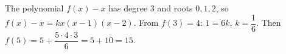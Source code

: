 The polynomial $f(x)-x$ has degree $3$ and roots $0,1,2$, so $f(x)-x=kx(x-1)(x-2)$. From $f(3)=4$: $1=6k$, $k=\dfrac{1}{6}$. Then $f(5)=5+\dfrac{5\cdot4\cdot3}{6}=5+10=\boxed{15}$.
